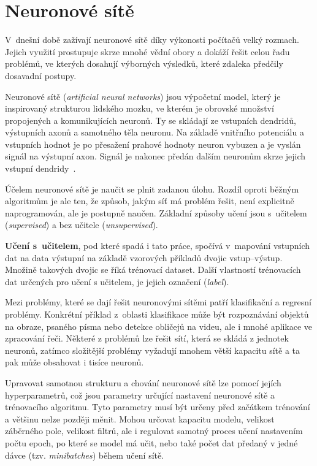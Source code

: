 

\chapter{Neuronové sítě}
\label{neuronovky}
V~dnešní době zažívají neuronové sítě díky výkonosti počítačů velký rozmach. Jejich využití prostupuje skrze mnohé vědní obory a dokáží řešit celou řadu problémů, ve kterých dosahují výborných výsledků, které zdaleka předčily dosavadní postupy. 

Neuronové sítě (\textit{artificial neural networks}) jsou výpočetní model, který je inspirovaný strukturou lidského mozku, ve kterém je obrovské množství propojených a komunikujících neuronů. Ty se skládají ze vstupních dendridů, výstupních axonů a samotného těla neuronu. Na základě vnitřního potenciálu a vstupních hodnot je po přesažení prahové hodnoty neuron vybuzen a je vyslán signál na výstupní axon. Signál je nakonec předán dalším neuronům skrze jejich vstupní dendridy~\cite[p.~65--66]{mitdeeplearning_small}.

Účelem neuronové sítě je naučit se plnit zadanou úlohu. Rozdíl oproti běžným algoritmům je ale ten, že způsob, jakým síť má problém řešit, není explicitně naprogramován, ale je postupně naučen. Základní způsoby učení jsou s~učitelem (\textit{supervised}) a bez učitele (\textit{unsupervised}). 

\textbf{Učení s~učitelem}, pod které spadá i tato práce, spočívá v~mapování vstupních dat na data výstupní na základě vzorových příkladů dvojic vstup--výstup. Množině takových dvojic se říká trénovací dataset. Další vlastností trénovacích dat určených pro učení s učitelem, je jejich označení (\textit{label}).

Mezi problémy, které se dají řešit neuronovými sítěmi patří klasifikační a regresní problémy. Konkrétní příklad z~oblasti klasifikace může být rozpoznávání objektů na obraze, psaného písma nebo detekce obličejů na videu, ale i mnohé aplikace ve zpracování řeči. Některé z problémů lze řešit sítí, která se skládá z jednotek neuronů, zatímco složitější problémy vyžadují mnohem větší kapacitu sítě a ta pak může obsahovat i tisíce neuronů.

Upravovat samotnou strukturu a chování neuronové sítě lze pomocí jejích hyperparametrů, což jsou parametry určující nastavení neuronové sítě a trénovacího algoritmu. Tyto parametry musí být určeny před začátkem trénování a většinu nelze později měnit. Mohou určovat kapacitu modelu, velikost záběrného pole, velikost filtrů, ale i regulovat samotný proces učení nastavením počtu epoch, po které se model má učit, nebo také počet dat předaný v jedné dávce (tzv. \textit{minibatches}) během učení sítě.


